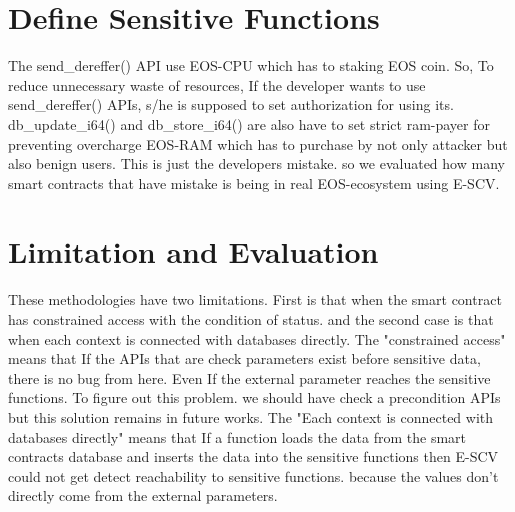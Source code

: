 \section{Define Sensitive Functions}
The send\_dereffer() API use EOS-CPU which has to staking EOS coin. So, To reduce unnecessary waste of resources, If the developer wants to use send\_dereffer() APIs, s/he is supposed to set authorization for using its. db\_update\_i64() and db\_store\_i64() are also have to set strict ram-payer for preventing overcharge EOS-RAM which has to purchase by not only attacker but also benign users. This is just the developers mistake. so we evaluated how many smart contracts that have mistake is being in real EOS-ecosystem using E-SCV.

\section{Limitation and Evaluation}



These methodologies have two limitations. First is that when the smart contract has constrained access with the condition of status. and the second case is that when each context is connected with databases directly. 
The "constrained access" means that If the APIs that are check parameters exist before sensitive data, there is no bug from here. Even If the external parameter reaches the sensitive functions. To figure out this problem. we should have check a precondition APIs but this solution remains in future works.
The "Each context is connected with databases directly" means that If a function loads the data from the smart contracts database and inserts the data into the sensitive functions then E-SCV could not get detect reachability to sensitive functions. because the values don't directly come from the external parameters. 


